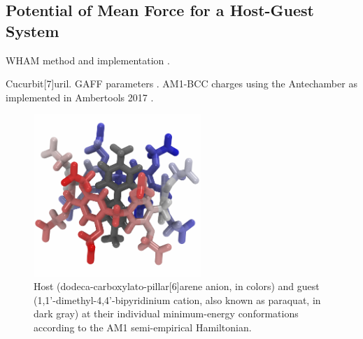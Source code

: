 \documentclass[
    journal=jctcce,
    layout=twocolumn
]{achemso}
\newcommand{\avg}[1]{\overline{#1}}             %
\begin{document}
%


\subsection{Potential of Mean Force for a Host-Guest System}

WHAM method\cite{Ferrenberg_1989, *Kumar_1992} and implementation \cite{Grossfield_nodate}.

Cucurbit[7]uril. GAFF parameters \cite{Wang_2004}. AM1-BCC charges \cite{Jakalian_2000, *Jakalian_2002} using the Antechamber \cite{Wang_2006} as implemented in Ambertools 2017 \cite{Case_2017}.


\begin{figure}
	\label{fig:carboxylatopillar[6]arene}
	\centering
	\includegraphics[width=2.5in]{wp6_paraquat.png}
	\caption{Host (dodeca-carboxylato-pillar[6]arene anion, in colors) and guest (1,1'-dimethyl-4,4'-bipyridinium cation, also known as paraquat, in dark gray) at their individual minimum-energy conformations according to the AM1 semi-empirical Hamiltonian.}
\end{figure}
\end{document}
